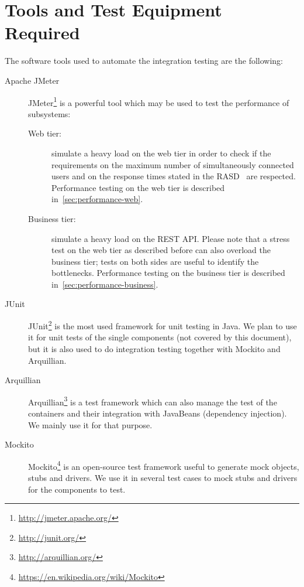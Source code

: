 \chapter{Tools and Test Equipment Required}
\label{chap:tools}

The software tools used to automate the integration testing are the following:
\begin{description}
    \item[Apache JMeter
    ]
    JMeter\footnote{\url{http://jmeter.apache.org/}} is a powerful tool which may be used to test the performance of subsystems:
    \begin{description}
        \item[Web tier:] simulate a heavy load on the web tier in order to check if the requirements on the maximum number of simultaneously connected users and on the response times stated in the RASD~\cite[p.~57]{mytaxi-rasd} are respected. Performance testing on the web tier is described in~\autoref{sec:performance-web}.
        \item[Business tier:] simulate a heavy load on the REST API. Please note that a stress test on the web tier as described before can also overload the business tier; tests on both sides are useful to identify the bottlenecks. Performance testing on the business tier is described in~\autoref{sec:performance-business}.
    \end{description}

    \item[JUnit] JUnit\footnote{\url{http://junit.org/}} is the most used framework for unit testing in Java. We plan to use it for unit tests of the single components (not covered by this document), but it is also used to do integration testing together with Mockito and Arquillian.

    \item[Arquillian] Arquillian\footnote{\url{http://arquillian.org/}} is a test framework which can also manage the test of the containers and their integration with JavaBeans (dependency injection). We mainly use it for that purpose.

    \item[Mockito] Mockito\footnote{\url{https://en.wikipedia.org/wiki/Mockito}} is an open-source test framework useful to generate mock objects, stubs and drivers.
    We use it in several test cases to mock stubs and drivers for the components to test.

\end{description}
